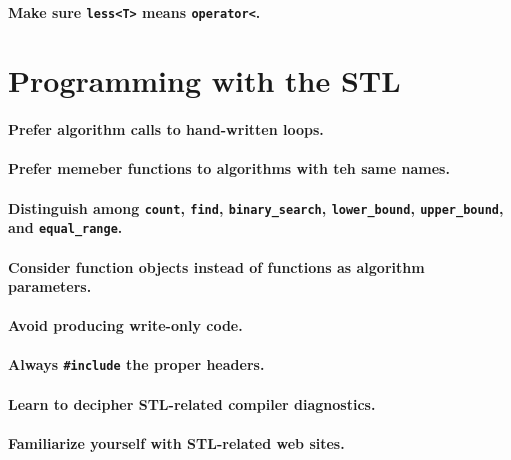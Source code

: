 \documentclass{article}
\begin{document}
\paragraph{Make sure {\tt less<T>} means {\tt operator<}.}

\section{Programming with the STL}

\paragraph{Prefer algorithm calls to hand-written loops.}
\paragraph{Prefer memeber functions to algorithms with teh same names.}
\paragraph{Distinguish among {\tt count}, {\tt find}, {\tt binary\_search}, {\tt lower\_bound}, {\tt upper\_bound}, and {\tt equal\_range}.}
\paragraph{Consider function objects instead of functions as algorithm parameters.}
\paragraph{Avoid producing write-only code.}
\paragraph{Always {\tt \#include} the proper headers.}
\paragraph{Learn to decipher STL-related compiler diagnostics.}
\paragraph{Familiarize yourself with STL-related web sites.}
\end{document}
